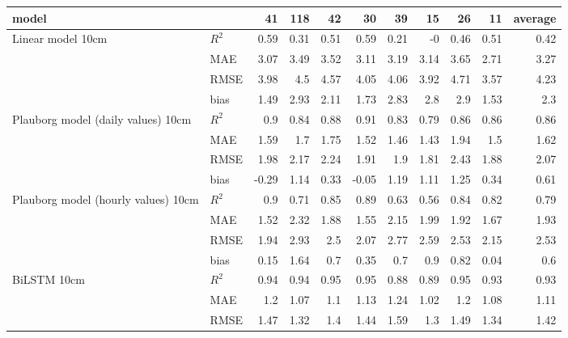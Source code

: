 \begin{tabular}{llrrrrrrrrr}
\hline
 model                               &       &    41 &   118 &    42 &    30 &   39 &    15 &   26 &    11 &   average \\
\hline
 Linear model 10cm                   & $R^2$ &  0.59 &  0.31 &  0.51 &  0.59 & 0.21 & -0    & 0.46 &  0.51 &      0.42 \\
                                     & MAE   &  3.07 &  3.49 &  3.52 &  3.11 & 3.19 &  3.14 & 3.65 &  2.71 &      3.27 \\
                                     & RMSE  &  3.98 &  4.5  &  4.57 &  4.05 & 4.06 &  3.92 & 4.71 &  3.57 &      4.23 \\
                                     & bias  &  1.49 &  2.93 &  2.11 &  1.73 & 2.83 &  2.8  & 2.9  &  1.53 &      2.3  \\
 Plauborg model (daily values) 10cm  & $R^2$ &  0.9  &  0.84 &  0.88 &  0.91 & 0.83 &  0.79 & 0.86 &  0.86 &      0.86 \\
                                     & MAE   &  1.59 &  1.7  &  1.75 &  1.52 & 1.46 &  1.43 & 1.94 &  1.5  &      1.62 \\
                                     & RMSE  &  1.98 &  2.17 &  2.24 &  1.91 & 1.9  &  1.81 & 2.43 &  1.88 &      2.07 \\
                                     & bias  & -0.29 &  1.14 &  0.33 & -0.05 & 1.19 &  1.11 & 1.25 &  0.34 &      0.61 \\
 Plauborg model (hourly values) 10cm & $R^2$ &  0.9  &  0.71 &  0.85 &  0.89 & 0.63 &  0.56 & 0.84 &  0.82 &      0.79 \\
                                     & MAE   &  1.52 &  2.32 &  1.88 &  1.55 & 2.15 &  1.99 & 1.92 &  1.67 &      1.93 \\
                                     & RMSE  &  1.94 &  2.93 &  2.5  &  2.07 & 2.77 &  2.59 & 2.53 &  2.15 &      2.53 \\
                                     & bias  &  0.15 &  1.64 &  0.7  &  0.35 & 0.7  &  0.9  & 0.82 &  0.04 &      0.6  \\
 BiLSTM 10cm                         & $R^2$ &  0.94 &  0.94 &  0.95 &  0.95 & 0.88 &  0.89 & 0.95 &  0.93 &      0.93 \\
                                     & MAE   &  1.2  &  1.07 &  1.1  &  1.13 & 1.24 &  1.02 & 1.2  &  1.08 &      1.11 \\
                                     & RMSE  &  1.47 &  1.32 &  1.4  &  1.44 & 1.59 &  1.3  & 1.49 &  1.34 &      1.42 \\

\end{tabular}
